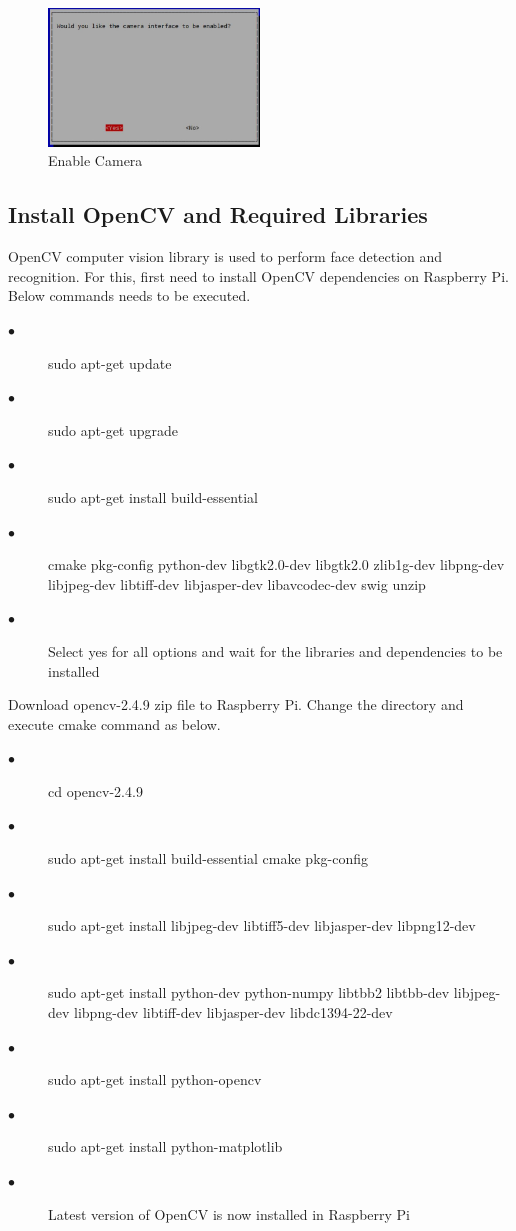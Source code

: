 \documentclass[sigconf]{acmart}
\begin{document}
\begin{figure}[ht!]
  \includegraphics[width=0.5\textwidth]{project/images/enablecamera3.jpg}
  \caption{Enable Camera}
\end{figure}

\subsection{Install OpenCV and Required Libraries}
OpenCV computer vision library is used to perform face detection and recognition. For this, first need to install OpenCV dependencies on Raspberry Pi. Below commands needs to be executed. 
\begin{description}
    \item[$\bullet$] sudo apt-get update
    \item[$\bullet$] sudo apt-get upgrade
    \item[$\bullet$] sudo apt-get install build-essential
    \item[$\bullet$] cmake pkg-config python-dev libgtk2.0-dev libgtk2.0 zlib1g-dev libpng-dev libjpeg-dev libtiff-dev libjasper-dev libavcodec-dev swig unzip
    \item[$\bullet$] Select yes for all options and wait for the libraries and dependencies to be installed
\end{description}
Download opencv-2.4.9 zip file to Raspberry Pi. Change the directory and execute cmake command as below.
\begin{description}
    \item[$\bullet$] cd opencv-2.4.9
    \item[$\bullet$] sudo apt-get install build-essential cmake pkg-config
    \item[$\bullet$] sudo apt-get install libjpeg-dev libtiff5-dev libjasper-dev libpng12-dev
    \item[$\bullet$] sudo apt-get install python-dev python-numpy libtbb2 libtbb-dev libjpeg-dev libpng-dev libtiff-dev libjasper-dev libdc1394-22-dev
    \item[$\bullet$] sudo apt-get install python-opencv
    \item[$\bullet$] sudo apt-get install python-matplotlib
    \item[$\bullet$] Latest version of OpenCV is now installed in Raspberry Pi
\end{description}
\end{document}
